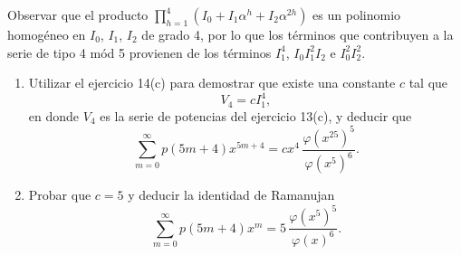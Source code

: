 \documentclass[12pt,a4paper]{book}
\begin{document}
    \begin{ejercicio}
        Observar que el producto $\prod_{h=1}^{4}(I_{0}+I_{1}\alpha^{h}+I_{2}\alpha^{2h})$ es un
        polinomio homogéneo en $I_{0}$, $I_{1}$, $I_{2}$ de grado 4, por lo que los términos que
        contribuyen a la serie de tipo 4 mód 5 provienen de los términos $I_{1}^{4}$, $I_{0}I_{1}^{2}I_{2}$
        e $I_{0}^{2}I_{2}^{2}$.
        \begin{enumerate}
            \item[(a)] Utilizar el ejercicio 14(c) para demostrar que existe una constante $c$
            tal que
            \begin{equation*}
                V_{4}=cI_{1}^{4},
            \end{equation*}
            en donde $V_{4}$ es la serie de potencias del ejercicio 13(c), y deducir que
            \begin{equation*}
                \sum_{m=0}^{\infty}p(5m+4)x^{5m+4}=cx^{4}\,\frac{\varphi(x^{25})^{5}}{\varphi(x^{5})^{6}}.
            \end{equation*}
            \item[(b)] Probar que $c=5$ y deducir la identidad de Ramanujan
            \begin{equation*}
                \sum_{m=0}^{\infty}p(5m+4)x^{m}=5\,\frac{\varphi(x^{5})^{5}}{\varphi(x)^{6}}.
            \end{equation*}
        \end{enumerate}
    \end{ejercicio}

\nocite{*}
\printbibliography[heading=bibintoc]

\cleardoublepage
\end{document}
